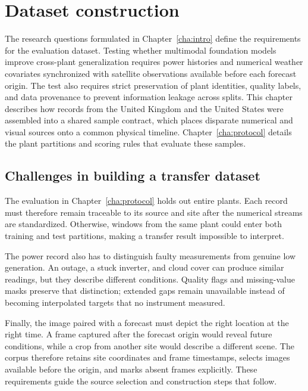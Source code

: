 \chapter{Dataset construction}
\label{cha:dataset}

The research questions formulated in Chapter~\ref{cha:intro} define the requirements for the evaluation dataset. Testing whether multimodal foundation models improve cross-plant generalization requires power histories and numerical weather covariates synchronized with satellite observations available before each forecast origin. The test also requires strict preservation of plant identities, quality labels, and data provenance to prevent information leakage across splits. This chapter describes how records from the United Kingdom and the United States were assembled into a shared sample contract, which places disparate numerical and visual sources onto a common physical timeline. Chapter~\ref{cha:protocol} details the plant partitions and scoring rules that evaluate these samples.

\section{Challenges in building a transfer dataset}

The evaluation in Chapter~\ref{cha:protocol} holds out entire plants. Each record must therefore remain traceable to its source and site after the numerical streams are standardized. Otherwise, windows from the same plant could enter both training and test partitions, making a transfer result impossible to interpret.

The power record also has to distinguish faulty measurements from genuine low generation. An outage, a stuck inverter, and cloud cover can produce similar readings, but they describe different conditions. Quality flags and missing-value masks preserve that distinction; extended gaps remain unavailable instead of becoming interpolated targets that no instrument measured.

Finally, the image paired with a forecast must depict the right location at the right time. A frame captured after the forecast origin would reveal future conditions, while a crop from another site would describe a different scene. The corpus therefore retains site coordinates and frame timestamps, selects images available before the origin, and marks absent frames explicitly. These requirements guide the source selection and construction steps that follow.

